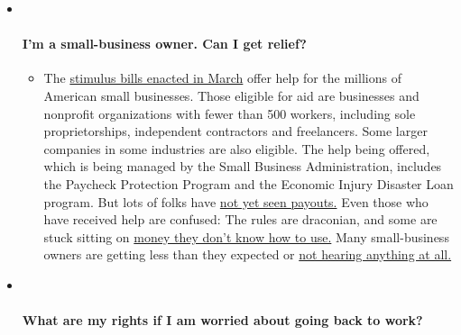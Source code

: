 \begin{itemize}
\item ~
  \hypertarget{im-a-small-business-owner-can-i-get-relief}{%
  \paragraph{I'm a small-business owner. Can I get
  relief?}\label{im-a-small-business-owner-can-i-get-relief}}

  \begin{itemize}
  \tightlist
  \item
    The
    \href{https://www.nytimes.com/article/small-business-loans-stimulus-grants-freelancers-coronavirus.html?action=click\&pgtype=Article\&state=default\&region=MAIN_CONTENT_3\&context=storylines_faq}{stimulus
    bills enacted in March} offer help for the millions of American
    small businesses. Those eligible for aid are businesses and
    nonprofit organizations with fewer than 500 workers, including sole
    proprietorships, independent contractors and freelancers. Some
    larger companies in some industries are also eligible. The help
    being offered, which is being managed by the Small Business
    Administration, includes the Paycheck Protection Program and the
    Economic Injury Disaster Loan program. But lots of folks have
    \href{https://www.nytimes.com/interactive/2020/05/07/business/small-business-loans-coronavirus.html?action=click\&pgtype=Article\&state=default\&region=MAIN_CONTENT_3\&context=storylines_faq}{not
    yet seen payouts.} Even those who have received help are confused:
    The rules are draconian, and some are stuck sitting on
    \href{https://www.nytimes.com/2020/05/02/business/economy/loans-coronavirus-small-business.html?action=click\&pgtype=Article\&state=default\&region=MAIN_CONTENT_3\&context=storylines_faq}{money
    they don't know how to use.} Many small-business owners are getting
    less than they expected or
    \href{https://www.nytimes.com/2020/06/10/business/Small-business-loans-ppp.html?action=click\&pgtype=Article\&state=default\&region=MAIN_CONTENT_3\&context=storylines_faq}{not
    hearing anything at all.}
  \end{itemize}
\item ~
  \hypertarget{what-are-my-rights-if-i-am-worried-about-going-back-to-work}{%
  \paragraph{What are my rights if I am worried about going back to
  work?}\label{what-are-my-rights-if-i-am-worried-about-going-back-to-work}}


\end{itemize}
